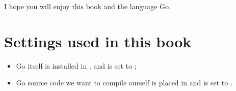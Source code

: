 I hope you will enjoy this book and the language Go.

\section*{Settings used in this book}
\begin{itemize}
\item Go itself is installed in , and  is set to  ;
\item Go source code we want to compile ourself is placed in  and
 is set to  .
\end{itemize}




